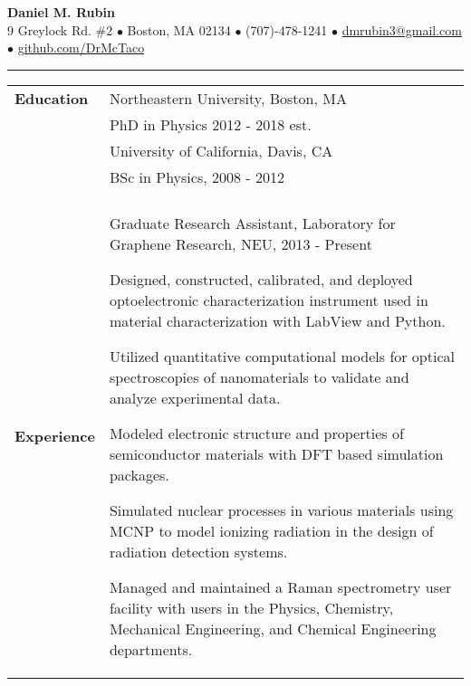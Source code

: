 \documentclass{article}
\begin{document}
\pagestyle{empty}

\begin{center}%
{\LARGE\bf{Daniel M. Rubin}}\\
9 Greylock Rd. \#2  $\bullet$  Boston, MA 02134  $\bullet$  (707)-478-1241  $\bullet$  \href{mailto:dmrubin3@gmail.com}{dmrubin3@gmail.com} $\bullet$ \href{https://github.com/DrMcTaco}{github.com/DrMcTaco}

\vspace*{-.5\baselineskip}
\rule{\textwidth}{1pt}

\addvspace{.2cm}

\begin{tabularx}{\linewidth}{>{\raggedright\bf\large{}}p{3.0cm}X}

Education & {\large Northeastern University}, Boston, MA\\
& PhD in Physics 2012 - 2018 est.\\
\rule{0pt}{0.5cm} & {\large University of California}, Davis, CA\\
& BSc in Physics, 2008 - 2012\\
& \\ %

 Experience & {\large Graduate Research Assistant, Laboratory for Graphene Research, NEU}, 2013 - Present
 \begin{compactitem}
	\item Designed, constructed, calibrated, and deployed optoelectronic characterization instrument  used in material characterization with LabView and Python. 
	\item Utilized quantitative computational models for optical spectroscopies of nanomaterials to validate and analyze experimental data.
	\item Modeled electronic structure and properties of semiconductor materials with DFT based simulation packages.
	\item Simulated nuclear processes in various materials using MCNP to model ionizing radiation in the design of radiation detection systems.
 	\item Managed and maintained a Raman spectrometry user facility with users in the Physics, Chemistry, Mechanical Engineering, and Chemical Engineering departments.
 \end{compactitem} \\ 


\end{tabularx}
\end{center}
\end{document}
